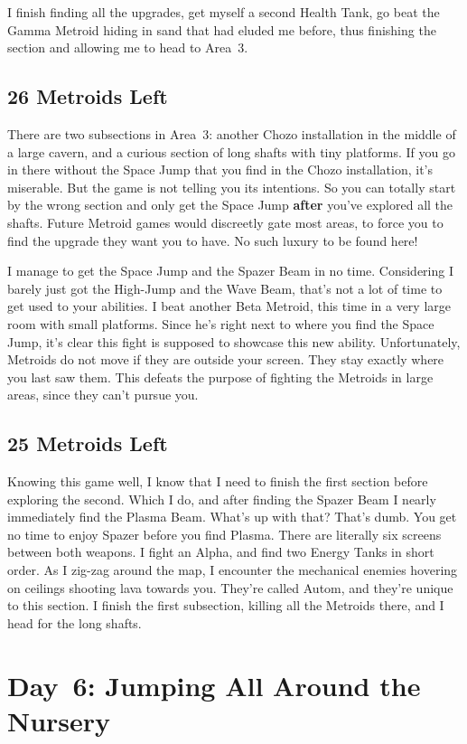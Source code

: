 \documentclass{book}
\begin{document}
I finish finding all the upgrades, get myself a second Health Tank, go beat the Gamma Metroid hiding in sand that had eluded me before, thus finishing the section and allowing me to head to Area~3.\par
\FloatBarrier\subsection*{26 Metroids Left}
There are two subsections in Area~3: another Chozo installation in the middle of a large cavern, and a curious section of long shafts with tiny platforms. If you go in there without the Space Jump that you find in the Chozo installation, it’s miserable. But the game is not telling you its intentions. So you can totally start by the wrong section and only get the Space Jump \textbf{after} you’ve explored all the shafts. Future Metroid games would discreetly gate most areas, to force you to find the upgrade they want you to have. No such luxury to be found here!\par
I manage to get the Space Jump and the Spazer Beam in no time. Considering I barely just got the High-Jump and the Wave Beam, that’s not a lot of time to get used to your abilities. I beat another Beta Metroid, this time in a very large room with small platforms. Since he’s right next to where you find the Space Jump, it’s clear this fight is supposed to showcase this new ability. Unfortunately, Metroids do not move if they are outside your screen. They stay exactly where you last saw them. This defeats the purpose of fighting the Metroids in large areas, since they can’t pursue you.\par
\FloatBarrier\subsection*{25 Metroids Left}
Knowing this game well, I know that I need to finish the first section before exploring the second. Which I do, and after finding the Spazer Beam I nearly immediately find the Plasma Beam. What’s up with that? That’s dumb. You get no time to enjoy Spazer before you find Plasma. There are literally six screens between both weapons. I fight an Alpha, and find two Energy Tanks in short order. As I zig-zag around the map, I encounter the mechanical enemies hovering on ceilings shooting lava towards you. They’re called Autom, and they’re unique to this section. I finish the first subsection, killing all the Metroids there, and I head for the long shafts.\par
\FloatBarrier\section*{Day~6: Jumping All Around the Nursery}
\end{document}
